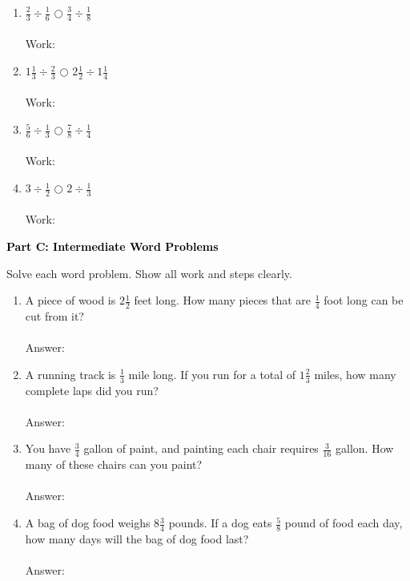 \documentclass[12pt, letterpaper, fleqn]{article}
\newcommand{\blanklong}{\underline{\hspace{6.5cm}}}
\begin{document}
\vspace{5mm}
\begin{enumerate}[itemsep=1.8cm, leftmargin=0.6cm]
\item $\frac{2}{3} \div \frac{1}{6}$ \quad $\bigcirc$ \quad $\frac{3}{4} \div \frac{1}{8}$ \\ \\
Work:
\vspace{5mm}
\item $1\frac{1}{3} \div \frac{2}{3}$ \quad $\bigcirc$ \quad $2\frac{1}{2} \div 1\frac{1}{4}$ \\ \\
Work:
\vspace{5mm}
\item $\frac{5}{6} \div \frac{1}{3}$ \quad $\bigcirc$ \quad $\frac{7}{8} \div \frac{1}{4}$ \\ \\
Work:
\vspace{5mm}
\item $3 \div \frac{1}{2}$ \quad $\bigcirc$ \quad $2 \div \frac{1}{3}$ \\ \\
Work:
\vspace{5mm}

\end{enumerate}
\newpage

\begin{tcolorbox}[colback=black!10]
    \large\textcolor{black}{\textbf{Part C: Intermediate Word Problems}}
\end{tcolorbox}

\vspace{3mm}
\noindent
Solve each word problem. Show all work and steps clearly.

\vspace{5mm}
\begin{enumerate}[itemsep=2.5cm, leftmargin=0.6cm]
\item A piece of wood is $2\frac{1}{2}$ feet long. How many pieces that are $\frac{1}{4}$ foot long can be cut from it? \\ \\
Answer: \blanklong

\item A running track is $\frac{1}{3}$ mile long. If you run for a total of $1\frac{2}{3}$ miles, how many complete laps did you run? \\ \\
Answer: \blanklong

\item You have $\frac{3}{4}$ gallon of paint, and painting each chair requires $\frac{3}{16}$ gallon. How many of these chairs can you paint? \\ \\
Answer: \blanklong

\item A bag of dog food weighs $8\frac{3}{4}$ pounds. If a dog eats $\frac{5}{8}$ pound of food each day, how many days will the bag of dog food last? \\ \\
Answer: \blanklong
\end{enumerate}
\end{document}
